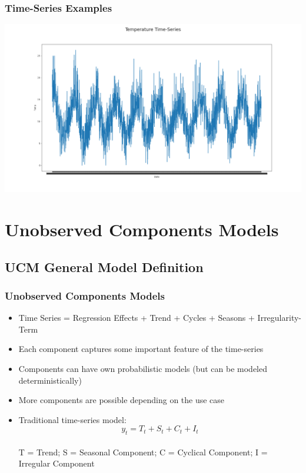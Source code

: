 \documentclass{beamer}
\begin{document}
\begin{frame}\frametitle{Time-Series Examples}
\includegraphics[width=\textwidth]{temperature_ts}
\end{frame}


\section{Unobserved Components Models} 
\subsection{UCM General Model Definition}
\begin{frame}[t]\frametitle{Unobserved Components Models}
\begin{itemize}
\item Time Series = Regression Effects + Trend + Cycles + Seasons + Irregularity-Term
\item Each component captures some important feature of the time-series
\item Components can have own probabilistic models (but can be modeled deterministically)
\item More components are possible depending on the use case
\item Traditional time-series model:\\
\bigskip
\[y_{t} = T_{t}+S_{t}+C_{t}+I_{t} \] \\
\bigskip
T = Trend;
S = Seasonal Component;
C = Cyclical Component;
I = Irregular Component
\end{itemize} 
\end{frame}
\end{document}
